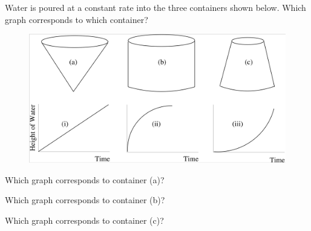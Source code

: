\documentclass{ximera}
\author{Vic Ferdinand, Betsy McNeal, Jenny Sheldon}
\begin{document}
\begin{exercise}
Water is poured at a constant rate into the three containers shown
below. Which graph corresponds to which container?

\begin{figure}[h]
\begin{center}
\includegraphics[width=\textwidth]{GraphicDetails2.png}
\end{center}
\end{figure}

Which graph corresponds to container (a)?
\begin{multipleChoice}
\end{multipleChoice}


Which graph corresponds to container (b)?
\begin{multipleChoice}
\end{multipleChoice}


Which graph corresponds to container (c)?
\begin{multipleChoice}
\end{multipleChoice}

\end{exercise}
\end{document}
